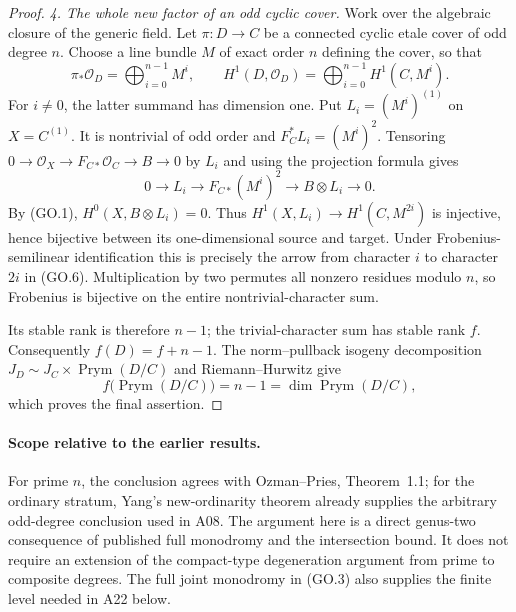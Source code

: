 \begin{proof}
\emph{4. The whole new factor of an odd cyclic cover.}
Work over the algebraic closure of the generic field.
Let $\pi:D\to C$ be a connected cyclic etale cover of
odd degree $n$.  Choose a line bundle $M$ of exact order
$n$ defining the cover, so that
\[
 \pi_*\mathcal O_D=\bigoplus_{i=0}^{n-1}M^i,\qquad
 H^1(D,\mathcal O_D)=\bigoplus_{i=0}^{n-1}H^1(C,M^i).
                                                               \tag{GO.6}
\]
For $i\ne0$, the latter summand has dimension one.
Put $L_i=(M^i)^{(1)}$ on $X=C^{(1)}$.  It is nontrivial
of odd order and $F_{C}^*L_i=(M^i)^2$.  Tensoring
$0\to\mathcal O_X\to F_{C*}\mathcal O_C\to B\to0$
by $L_i$ and using the projection formula gives
\[
 0\longrightarrow L_i\longrightarrow F_{C*}(M^i)^2
                 \longrightarrow B\otimes L_i
                 \longrightarrow0.                          \tag{GO.7}
\]
By (GO.1), $H^0(X,B\otimes L_i)=0$.  Thus
$H^1(X,L_i)\to H^1(C,M^{2i})$ is injective, hence
bijective between its one-dimensional source and target.
Under Frobenius-semilinear identification this is precisely
the arrow from character $i$ to character $2i$ in (GO.6).
Multiplication by two permutes all nonzero residues
modulo $n$, so Frobenius is bijective on the entire
nontrivial-character sum.

Its stable rank is therefore $n-1$; the trivial-character
sum has stable rank $f$.  Consequently
$f(D)=f+n-1$.  The norm--pullback isogeny decomposition
$J_D\sim J_C\times\operatorname{Prym}(D/C)$ and
Riemann--Hurwitz give
\[
 f\bigl(\operatorname{Prym}(D/C)\bigr)=n-1
       =\dim\operatorname{Prym}(D/C),
\]
which proves the final assertion.
\end{proof}

\paragraph{Scope relative to the earlier results.}
For prime $n$, the conclusion agrees with Ozman--Pries,
Theorem~1.1; for the ordinary stratum, Yang's
new-ordinarity theorem already supplies the arbitrary
odd-degree conclusion used in A08.
The argument here is a direct genus-two consequence of
published full monodromy and the intersection bound.  It
does not require an extension of the compact-type
degeneration argument from prime to composite degrees.
The full joint monodromy in (GO.3) also supplies the finite
level needed in A22 below.
